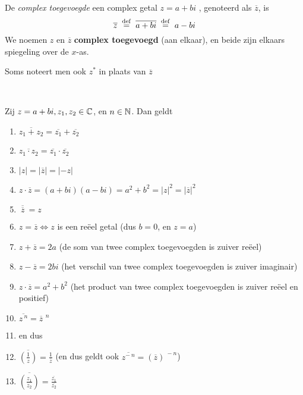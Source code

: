 \documentclass{ximera}
\begin{document}
 
\begin{definition}\ 
	
De \textit{complex toegevoegde} een complex getal $z=a+bi$  , genoteerd als $\overline{z}$, is 
$$
\overline{z}\;\overset{\mathrm{def}}{=}\;\overline{a+bi}\;\overset{\mathrm{def}}{=}\; a-bi
$$
We noemen $z$ en $\overline z$ \textbf{complex toegevoegd} (aan elkaar), en beide zijn elkaars spiegeling over de $x$-as.

Soms noteert men ook $z^*$ in plaats van $\overline{z}$
\end{definition}


\begin{proposition} \ 
	
Zij $z=a+bi,z_1,z_2\in \mathbb{C}$, en $n\in\mathbb{N}$. Dan geldt
\begin{enumerate}
\item $\overline{z_1+z_2}=\overline{z_1}+\overline{z_2}$
\item $\overline{z_1 \cdot z_2}=\overline{z_1}\cdot\overline{z_2}$
\item $|z|=|\overline{z}|=|-z|$

\item $z\cdot\overline{z}=(a+bi)(a-bi)= a^2+b^2=|z|^2 = |\overline{z}|^2 $
\item $\overline{\:\overline z\:}=z\qquad$ 

\item $z=\overline{z} \iff z$ is een reëel getal (dus $b=0$, en $z=a$)

\item $z+ \overline{z}=2a$ \quad (de som van twee complex toegevoegden is zuiver reëel)
\item $z- \overline{z}=2bi$ \quad (het verschil van twee complex toegevoegden is zuiver imaginair)
\item $z\cdot\overline{z}=a^2+b^2$ \quad (het product van twee complex toegevoegden is zuiver reëel en positief) 


\item $\overline{z^{\:n}}= \displaystyle \overline{z}^{\:\:n}$
\item {} en dus 

\item $\overline{\left(\frac{1}{z}\right)}=\frac{1}{\overline{z}}$  (en dus geldt ook $\overline{z^{-\:n}}= (\overline{z})^{\:-n}$)
\item $\displaystyle{\overline{\left(\frac{z_1}{z_2}\right)}=\frac{\overline{z_1}}{\overline{z_2}}}$
\end{enumerate}
\end{proposition}
\end{document}
